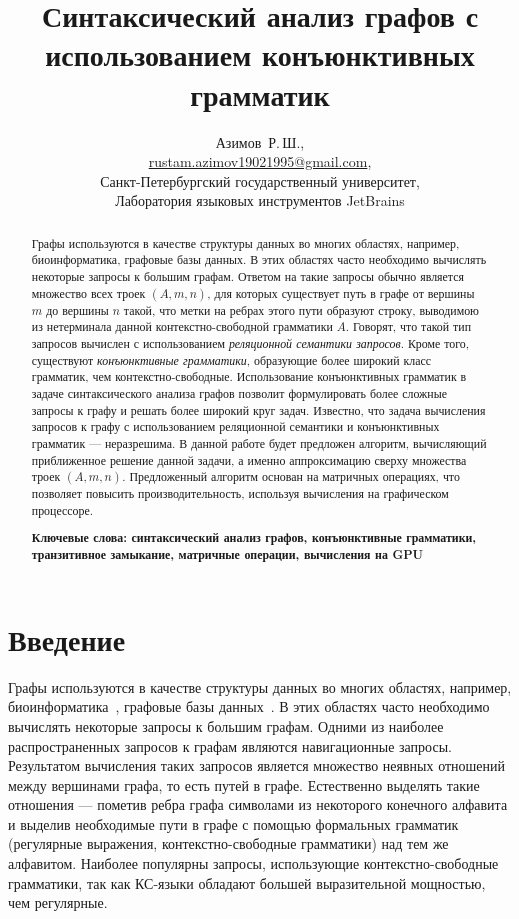 \documentclass [a4paper] {article}
\begin{document}
	\title{Синтаксический анализ графов с использованием конъюнктивных грамматик}
	\author{
		Азимов~Р.\,Ш., \\ \url {rustam.azimov19021995@gmail.com}, \\
		Санкт-Петербургский государственный университет, \\
		Лаборатория языковых инструментов JetBrains 
	}
	
	\maketitle
	
	\begin{abstract}
		Графы используются в качестве структуры данных во многих областях, например, биоинформатика, графовые базы данных. В этих областях часто необходимо вычислять некоторые запросы к большим графам. Ответом на такие запросы обычно является множество всех троек $(A, m, n)$, для которых существует путь в графе от вершины $m$ до вершины $n$ такой, что метки на ребрах этого пути образуют строку, выводимою из нетерминала данной контекстно-свободной грамматики $A$. Говорят, что такой тип запросов вычислен с использованием \textit{реляционной семантики запросов}. Кроме того, существуют \textit{конъюнктивные грамматики}, образующие более широкий класс грамматик, чем контекстно-свободные. Использование конъюнктивных грамматик в задаче синтаксического анализа графов позволит формулировать более сложные запросы к графу и решать более широкий круг задач. Известно, что задача вычисления запросов к графу с использованием реляционной семантики и конъюнктивных грамматик --- неразрешима. В данной работе будет предложен алгоритм, вычисляющий приближенное решение данной задачи, а именно аппроксимацию сверху множества троек $(A, m, n)$. Предложенный алгоритм основан на матричных операциях, что позволяет повысить производительность, используя вычисления на графическом процессоре.
		
		\vspace{1em}
		\textbf{Ключевые слова: синтаксический анализ графов, конъюнктивные грамматики, транзитивное замыкание, матричные операции, вычисления на GPU}  
	\end{abstract}
	
	\section{Введение}
	Графы используются в качестве структуры данных во многих областях, например, биоинформатика~\cite{Bio}, графовые базы данных~\cite{graphDB}. В этих областях часто необходимо вычислять некоторые запросы к большим графам. Одними из наиболее распространенных запросов к графам являются навигационные запросы. Результатом вычисления таких запросов является множество неявных отношений между вершинами графа, то есть путей в графе. Естественно выделять такие отношения --- пометив ребра графа символами из некоторого конечного алфавита и выделив необходимые пути в графе с помощью формальных грамматик (регулярные выражения, контекстно-свободные грамматики) над тем же алфавитом. Наиболее популярны запросы, использующие контекстно-свободные грамматики, так как КС-языки обладают большей выразительной мощностью, чем регулярные.
	
\end{document}
